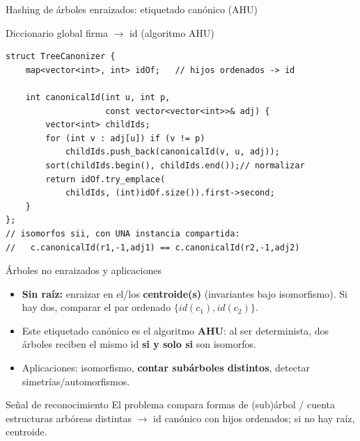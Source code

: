 \documentclass{beamer}
\begin{document}
\begin{frame}[fragile]{Hashing de árboles enraizados: etiquetado canónico (AHU)}
\begin{exampleblock}{Diccionario global firma $\to$ id (algoritmo AHU)}
\begin{verbatim}
struct TreeCanonizer {
    map<vector<int>, int> idOf;   // hijos ordenados -> id

    int canonicalId(int u, int p,
                    const vector<vector<int>>& adj) {
        vector<int> childIds;
        for (int v : adj[u]) if (v != p)
            childIds.push_back(canonicalId(v, u, adj));
        sort(childIds.begin(), childIds.end());// normalizar
        return idOf.try_emplace(
            childIds, (int)idOf.size()).first->second;
    }
};
// isomorfos sii, con UNA instancia compartida:
//   c.canonicalId(r1,-1,adj1) == c.canonicalId(r2,-1,adj2)
\end{verbatim}
\end{exampleblock}
\end{frame}

\begin{frame}{Árboles no enraizados y aplicaciones}
\begin{itemize}
    \item \textbf{Sin raíz:} enraizar en el/los \textbf{centroide(s)} (invariantes bajo isomorfismo). Si hay dos, comparar el par ordenado $\{id(c_1), id(c_2)\}$.
    \item Este etiquetado canónico es el algoritmo \textbf{AHU}: al ser determinista, dos árboles reciben el mismo id \textbf{si y solo si} son isomorfos.
    \item Aplicaciones: isomorfismo, \textbf{contar subárboles distintos}, detectar simetrías/automorfismos.
\end{itemize}
\begin{block}{Señal de reconocimiento}
El problema compara formas de (sub)árbol / cuenta estructuras arbóreas distintas $\to$ id canónico con hijos ordenados; si no hay raíz, centroide.
\end{block}
\end{frame}
\end{document}
